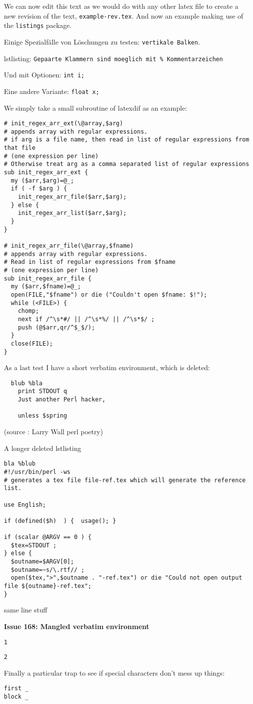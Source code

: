\documentclass{article}
\begin{document}
We can now edit
this text as we would do with any other latex file to create
a new revision of the text, \verb|example-rev.tex|.
\newpage
And now an example making use of the \lstinline|listings| package.

Einige Spezialf\"alle von L\"oschungen zu testen: \verb|vertikale Balken|.

lstlisting: \lstinline{Gepaarte Klammern sind moeglich mit % Kommentarzeichen}

Und mit Optionen: \lstinline[basicstyle=\footnotesize]{int i;}

Eine andere Variante:   \lstinline[basicstyle=\footnotesize]$float x;$ 


We simply take a small subroutine of latexdif as an example:
\lstset{language=perl}
\begin{lstlisting}[commentstyle=\color{gray}]
# init_regex_arr_ext(\@array,$arg)
# appends array with regular expressions.
# if arg is a file name, then read in list of regular expressions from that file
# (one expression per line)
# Otherwise treat arg as a comma separated list of regular expressions
sub init_regex_arr_ext {
  my ($arr,$arg)=@_;
  if ( -f $arg ) {
    init_regex_arr_file($arr,$arg);
  } else {
    init_regex_arr_list($arr,$arg);
  }
}

# init_regex_arr_file(\@array,$fname)
# appends array with regular expressions.
# Read in list of regular expressions from $fname
# (one expression per line)
sub init_regex_arr_file {
  my ($arr,$fname)=@_;
  open(FILE,"$fname") or die ("Couldn't open $fname: $!");
  while (<FILE>) {
    chomp;
    next if /^\s*#/ || /^\s*%/ || /^\s*$/ ;
    push (@$arr,qr/^$_$/);
  }
  close(FILE);
}
\end{lstlisting}

As a last test I have a short verbatim environment, which is deleted:
\begin{verbatim}  blub %bla
    print STDOUT q
    Just another Perl hacker,
   
    unless $spring
\end{verbatim}
(source : Larry Wall perl poetry)

A longer deleted lstlisting 
\begin{lstlisting}[commentstyle=\color{gray}]  bla %blub
#!/usr/bin/perl -ws
# generates a tex file file-ref.tex which will generate the reference list.

use English; 

if (defined($h)  ) {  usage(); }

if (scalar @ARGV == 0 ) {
  $tex=STDOUT ; 
} else {
  $outname=$ARGV[0];
  $outname=~s/\.rtf// ;
  open($tex,">",$outname . "-ref.tex") or die "Could not open output file ${outname}-ref.tex";
}
\end{lstlisting}  same line stuff

\textbf{Issue 168: Mangled verbatim environment}

\begin{verbatim}
1
\end{verbatim}
\begin{verbatim}
2
\end{verbatim}

Finally a particular trap to see if special characters don't mess up things:
\begin{verbatim}
first _
block _
\end{verbatim}
\end{document}
